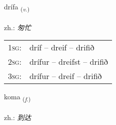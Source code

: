 \documentclass[frontgrid, backgrid]{flacards}\usepackage[]{graphicx}\usepackage[]{xcolor}
\begin{document}
\renewcommand{\flhead}{\vskip5pt \fboxsep=0pt {\small\bfseries\footnotesize Sagnorð | 动词}}
\renewcommand{\fcfoot}{\vskip5pt \fboxsep=0pt \hspace{2pt}{\small\bfseries\footnotesize 3K}}

\renewcommand{\blhead}{\vskip5pt {\small\bfseries\footnotesize Sagnorð | 动词 }}
\renewcommand{\bcfoot}{\vskip5pt \hspace{2pt}{\small\bfseries\footnotesize 3K}}


{drífa \small{\textsubscript{(\textit{v.})}} \\[1ex] %
\textphonetic{[triːva]} \\
zh.: \emph{匆忙} \\  [2ex]
\renewcommand*{\arraystretch}{0.8}
\begin{tabular}{p{1cm}l}
\textsc{1sg}: & dríf -- dreif -- drifið \\ 
\textsc{2sg}: & drífur -- dreifst -- drifið \\ 
\textsc{3sg}: & drífur -- dreif -- drifið \\ 
\end{tabular}
}

\renewcommand{\flhead}{\vskip5pt \fboxsep=0pt {\small\bfseries\footnotesize Nafnorð | 名词}}
\renewcommand{\fcfoot}{\vskip5pt \fboxsep=0pt \hspace{2pt}{\small\bfseries\footnotesize 3K}}

\renewcommand{\blhead}{\vskip5pt {\small\bfseries\footnotesize Nafnorð | 名词 }}
\renewcommand{\bcfoot}{\vskip5pt \hspace{2pt}{\small\bfseries\footnotesize 3K}}


{koma \small{\textsubscript{(\textit{f.})}} \\[1ex] %
\textphonetic{[kʰɔːma]} \\
zh.: \emph{到达} \\  [2ex]
\renewcommand*{\arraystretch}{0.8}
}
\end{document}
